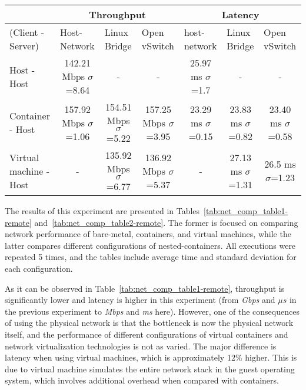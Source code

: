 \documentclass[conference]{IEEEtran}
\begin{document}
\begin{table*}
\renewcommand{\arraystretch}{1.3}
\centering
\caption{Network throughput and latency evaluation for different
    configurations of client/server under bare-metal, container
and virtual machine across two hosts}
\begin{tabular}{|l|c|c|c||c|c|c|}
\hline
& \multicolumn{3}{c||}{Throughput} & \multicolumn{3}{c|}{Latency}                                                                \\ \hline
(Client - Server) & \multicolumn{1}{l|}{Host-Network} & \multicolumn{1}{l|}{Linux Bridge } & \multicolumn{1}{l||}{Open vSwitch} & \multicolumn{1}{l|}{host-network} & \multicolumn{1}{l|}{Linux Bridge } & \multicolumn{1}{l|}{Open vSwitch}  \\ \hline
\hline
Host - Host            & 142.21 Mbps $\sigma$=8.64 & -                        & -                        & 25.97 ms	$\sigma$=1.7 & -                     & -                  \\ \hline
Container - Host       & 157.92 Mbps $\sigma$=1.06 & 154.51 Mbps $\sigma$=5.22& 157.25 Mbps $\sigma$=3.95& 23.29 ms $\sigma$=0.15& 23.83 ms $\sigma$=0.82& 23.40 ms	$\sigma$=0.58\\\hline
Virtual machine - Host & - 						   &135.92 Mbps $\sigma$=6.77 & 136.92 Mbps $\sigma$=5.37& - 	                 & 27.13 ms $\sigma$=1.31& 26.5 ms $\sigma$=1.23\\\hline
\end{tabular}
\label{tab:net_comp_table1-remote}
\end{table*}

The results of this experiment are presented in
Tables~\ref{tab:net_comp_table1-remote} and~\ref{tab:net_comp_table2-remote}.
The former is focused on comparing network performance of bare-metal,
containers, and virtual machines, while the latter compares different
configurations of nested-containers.  All executions were repeated
5 times, and the tables include average time and standard deviation for each
configuration.



As it can be observed in Table~\ref{tab:net_comp_table1-remote}, throughput is
significantly lower and latency is higher in this experiment (from \textit{Gbps}
and \textit{$\mu s$} in the previous experiment to \textit{Mbps} and
\textit{ms} here). However, one of the consequences of using the physical
network is that the bottleneck is now the physical network itself, and the
performance of different configurations of virtual containers and network
virtualization technologies is not as varied. The major difference is
latency when using virtual machines, which is approximately 12\% higher.  This
is due to virtual machine simulates the entire network stack in the guest
operating system, which involves additional overhead when compared with
containers.
\end{document}
